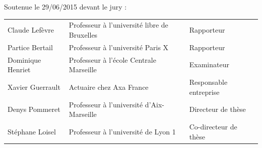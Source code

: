 {\begin{titlepage}
\begin{flushleft}
\begin{center}
\end{center}
\vspace{1cm}
    \normalsize Soutenue le 29/06/2015 devant le jury :\\
\end{flushleft}
\vspace{0.2cm}
\begin{tabular}{lll}
    \vspace{0.08cm}
	Claude Lefèvre & Professeur à l\rq{}université libre de Bruxelles & Rapporteur \\
    \vspace{0.08cm}
	Partice Bertail &  Professeur à l\rq{}université Paris X  & Rapporteur \\
    \vspace{0.08cm}
	Dominique Henriet & Professeur à l\rq{}école Centrale Marseille & Examinateur \\
    \vspace{0.08cm}
	Xavier Guerrault & Actuaire chez Axa France & Responsable entreprise \\
    \vspace{0.08cm}
	Denys Pommeret & Professeur à l\rq{}université d\rq{}Aix-Marseille & Directeur de thèse \\
\vspace{0.08cm}
	Stéphane Loisel & Professeur à l\rq{}université de Lyon 1 & Co-directeur de thèse \\
\end{tabular}

\end{titlepage}}
